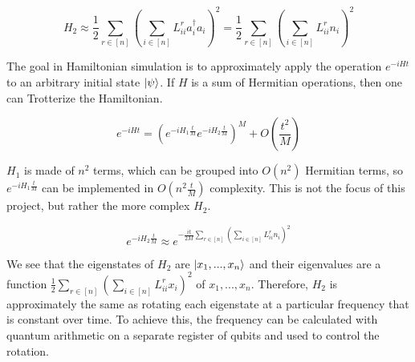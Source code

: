 \documentclass{article}
\begin{document}
\begin{equation}
    H_2 \approx \frac{1}{2}\sum_{r \in [n]} (\sum_{i \in [n]} L^r_{ii}a_i^\dag a_i)^2 = \frac{1}{2}\sum_{r \in [n]} (\sum_{i \in [n]} L^r_{ii}n_i)^2
\end{equation}

The goal in Hamiltonian simulation is to approximately apply the operation $e^{-iHt}$ to an arbitrary initial state $\ket{\psi}$. If $H$ is a sum of Hermitian operations, then one can Trotterize the Hamiltonian.

\begin{equation}
    e^{-iHt} = (e^{-iH_1\frac{t}{M}}e^{-iH_2\frac{t}{M}})^{M} + O(\frac{t^2}{M})
\end{equation}

$H_1$ is made of $n^2$ terms, which can be grouped into $O(n^2)$ Hermitian terms, so $e^{-iH_1\frac{t}{M}}$ can be implemented in $O(n^2\frac{t}{M})$ complexity. This is not the focus of this project, but rather the more complex $H_2$.

\begin{equation}
    e^{-iH_2\frac{t}{M}} \approx e^{-\frac{it}{2M}\sum_{r \in [n]} (\sum_{i \in [n]} L^r_{ii}n_i)^2}
\end{equation}

We see that the eigenstates of $H_2$ are $\ket{x_1, ..., x_n}$ and their eigenvalues are a function $\frac{1}{2}\sum_{r \in [n]} (\sum_{i \in [n]} L^r_{ii}x_i)^2$ of $x_1, ..., x_n$. Therefore, $H_2$ is approximately the same as rotating each eigenstate at a particular frequency that is constant over time. To achieve this, the frequency can be calculated with quantum arithmetic on a separate register of qubits and used to control the rotation.
\end{document}
